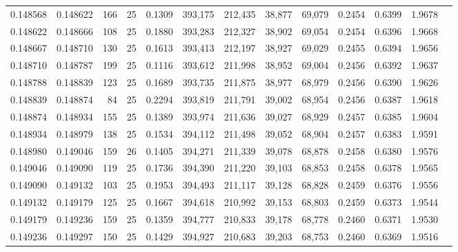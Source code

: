 \begin{tabular}{rrrrrrrrrrrrr}
0.148568 & 0.148622 &   166 &  25 &                                     0.1309 & 393,175 & 212,435 &  38,877 &  69,079 & 0.2454 & 0.6399 & 1.9678 \\
0.148622 & 0.148666 &   108 &  25 &                                     0.1880 & 393,283 & 212,327 &  38,902 &  69,054 & 0.2454 & 0.6396 & 1.9668 \\
0.148667 & 0.148710 &   130 &  25 &                                     0.1613 & 393,413 & 212,197 &  38,927 &  69,029 & 0.2455 & 0.6394 & 1.9656 \\
0.148710 & 0.148787 &   199 &  25 &                                     0.1116 & 393,612 & 211,998 &  38,952 &  69,004 & 0.2456 & 0.6392 & 1.9637 \\
0.148788 & 0.148839 &   123 &  25 &                                     0.1689 & 393,735 & 211,875 &  38,977 &  68,979 & 0.2456 & 0.6390 & 1.9626 \\
0.148839 & 0.148874 &    84 &  25 &                                     0.2294 & 393,819 & 211,791 &  39,002 &  68,954 & 0.2456 & 0.6387 & 1.9618 \\
0.148874 & 0.148934 &   155 &  25 &                                     0.1389 & 393,974 & 211,636 &  39,027 &  68,929 & 0.2457 & 0.6385 & 1.9604 \\
0.148934 & 0.148979 &   138 &  25 &                                     0.1534 & 394,112 & 211,498 &  39,052 &  68,904 & 0.2457 & 0.6383 & 1.9591 \\
0.148980 & 0.149046 &   159 &  26 &                                     0.1405 & 394,271 & 211,339 &  39,078 &  68,878 & 0.2458 & 0.6380 & 1.9576 \\
0.149046 & 0.149090 &   119 &  25 &                                     0.1736 & 394,390 & 211,220 &  39,103 &  68,853 & 0.2458 & 0.6378 & 1.9565 \\
0.149090 & 0.149132 &   103 &  25 &                                     0.1953 & 394,493 & 211,117 &  39,128 &  68,828 & 0.2459 & 0.6376 & 1.9556 \\
0.149132 & 0.149179 &   125 &  25 &                                     0.1667 & 394,618 & 210,992 &  39,153 &  68,803 & 0.2459 & 0.6373 & 1.9544 \\
0.149179 & 0.149236 &   159 &  25 &                                     0.1359 & 394,777 & 210,833 &  39,178 &  68,778 & 0.2460 & 0.6371 & 1.9530 \\
0.149236 & 0.149297 &   150 &  25 &                                     0.1429 & 394,927 & 210,683 &  39,203 &  68,753 & 0.2460 & 0.6369 & 1.9516 \\

\end{tabular}
